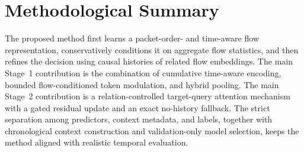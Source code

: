 \documentclass[11pt,fleqn]{report}
\begin{document}



\section{Methodological Summary}
\label{subsec:method_summary}

The proposed method first learns a packet-order- and time-aware flow
representation, conservatively conditions it on aggregate flow statistics, and
then refines the decision using causal histories of related flow embeddings.
The main Stage~1 contribution is the combination of cumulative time-aware
encoding, bounded flow-conditioned token modulation, and hybrid pooling. The
main Stage~2 contribution is a relation-controlled target-query attention
mechanism with a gated residual update and an exact no-history fallback. The
strict separation among predictors, context metadata, and labels, together
with chronological context construction and validation-only model selection,
keeps the method aligned with realistic temporal evaluation.


%
%
\providecommand{\ExpGPU}{\textit{[insert accelerator model and memory]}}
\providecommand{\ExpCPU}{\textit{[insert CPU model and RAM]}}
\providecommand{\ExpOS}{\textit{[insert operating system or Colab runtime]}}
\providecommand{\ExpSoftware}{\textit{[insert Python, PyTorch, CUDA, and scikit-learn versions]}}
\providecommand{\ExpSuricata}{\textit{[insert Suricata version and custom-plugin revision]}}
\end{document}
